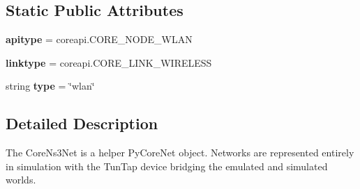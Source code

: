 \subsection*{Static Public Attributes}
\begin{DoxyCompactItemize}
\item 
\hypertarget{classcorens3_1_1obj_1_1_core_ns3_net_a3de81344cb9b5e73598c728172c8ad5a}{{\bfseries apitype} = coreapi.\+C\+O\+R\+E\+\_\+\+N\+O\+D\+E\+\_\+\+W\+L\+A\+N}\label{classcorens3_1_1obj_1_1_core_ns3_net_a3de81344cb9b5e73598c728172c8ad5a}

\item 
\hypertarget{classcorens3_1_1obj_1_1_core_ns3_net_a3af54dd82c0066d87b0e70932a285e0c}{{\bfseries linktype} = coreapi.\+C\+O\+R\+E\+\_\+\+L\+I\+N\+K\+\_\+\+W\+I\+R\+E\+L\+E\+S\+S}\label{classcorens3_1_1obj_1_1_core_ns3_net_a3af54dd82c0066d87b0e70932a285e0c}

\item 
\hypertarget{classcorens3_1_1obj_1_1_core_ns3_net_aec1aaa2c0334d193b73f7e4b3dcaaff4}{string {\bfseries type} = \char`\"{}wlan\char`\"{}}\label{classcorens3_1_1obj_1_1_core_ns3_net_aec1aaa2c0334d193b73f7e4b3dcaaff4}

\end{DoxyCompactItemize}


\subsection{Detailed Description}
\begin{DoxyVerb}The CoreNs3Net is a helper PyCoreNet object. Networks are represented
entirely in simulation with the TunTap device bridging the emulated and
simulated worlds.
\end{DoxyVerb}
 

